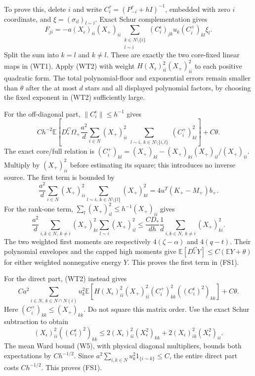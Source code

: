 \documentclass[10pt]{article}
\numberwithin{equation}{section}
\newcommand{\1}{\mathbf1}
\begin{document}
To prove this, delete $i$ and write
$C_i^\tau=(P^\tau_{-i}+hI)^{-1}$, embedded with zero $i$ coordinate,
and $\xi=(\sigma_{il})_{l\sim i}$. Exact Schur complementation gives
\[
 F_{ji}=-a(X_\epsilon)_{ii}(X_+)_{ii}
 \sum_{\substack{k\in N\setminus\{i\}\\l\sim i}}
 (C_i^\epsilon)_{jk}u_k(C_i^+)_{kl}\xi_l.
 \tag{FS2}
\]
Split the sum into $k=l$ and $k\ne l$. These are exactly the two
core-fixed linear maps in (WT1). Apply (WT2) with weight
$H(X_\epsilon)_{ii}^2(X_+)_{ii}^2$ to each positive quadratic form.
The total polynomial-floor and exponential errors remain smaller
than $\theta$ after the at most $d$ stars and all displayed polynomial
factors, by choosing the fixed exponent in (WT2) sufficiently large.

For the off-diagonal part, $\|C_i^\epsilon\|\le h^{-1}$ gives
\[
 C h^{-2}\mathbb E\left[D_*^C\Omega_+
 \frac{a^2}{d}\sum_{i\in N}(X_+)_{ii}^2
 \sum_{\substack{l\sim i,\ k\in N\setminus\{i,l\}}}
                        (C_i^+)_{kl}^2\right]+C\theta.
 \tag{FS3}
\]
The exact core/full relation is
$(C_i^+)_{kl}=(X_+)_{kl}-(X_+)_{ki}(X_+)_{il}/(X_+)_{ii}$.
Multiply by $(X_+)_{ii}^2$ before estimating its square; this
introduces no inverse source. The first term is bounded by
\[
 \frac{a^2}{d}\sum_{i\in N}(X_+)_{ii}^2
       \sum_{l\sim i,\ k\in N\setminus\{l\}}(X_+)_{kl}^2
       =4u^T(K_+-M_+)b_+.
\]
For the rank-one term, $\sum_l(X_+)_{il}^2\le h^{-1}(X_+)_{ii}$ gives
\[
 \frac{a^2}{d}\sum_{i,k\in N,\ k\ne i}(X_+)_{ki}^2
                    \sum_{l\sim i}(X_+)_{il}^2
 \le\frac{CD_*}{dh}\frac1d
           \sum_{i,k\in N,\ k\ne i}(X_+)_{ki}^2.
\]
The two weighted first moments are respectively
$4(\zeta-\alpha)$ and $4(q-t)$.
Their polynomial envelopes and the capped high moments give
$\mathbb E[D_*^C Y]\le C(\mathbb EY+\theta)$ for either weighted
nonnegative energy $Y$. This proves the first term in (FS1).

For the direct part, (WT2) instead gives
\[
 Ca^2\sum_{i\in N,\ k\in N\cap N(i)}u_k^2
 \mathbb E\left[H(X_\epsilon)_{ii}^2(X_+)_{ii}^2
                (C_i^+)_{kk}^2((C_i^\epsilon)^2)_{kk}\right]
 +C\theta.
\]
Here $(C_i^+)_{kk}\le(X_+)_{kk}$. Do not square this matrix order.
Use the exact Schur subtraction to obtain
\[
 (X_\epsilon)_{ii}^2((C_i^\epsilon)^2)_{kk}
 \le2(X_\epsilon)_{ii}^2(X_\epsilon^2)_{kk}
              +2(X_\epsilon)_{ik}^2(X_\epsilon^2)_{ii}.
\]
The mean Ward bound (W5), with physical diagonal multipliers, bounds
both expectations by $Ch^{-1/2}$. Since
$a^2\sum_{i,k\in N}u_k^2 1_{\{i\sim k\}}\le C$, the entire direct
part costs $Ch^{-1/2}$. This proves (FS1).
\end{document}

